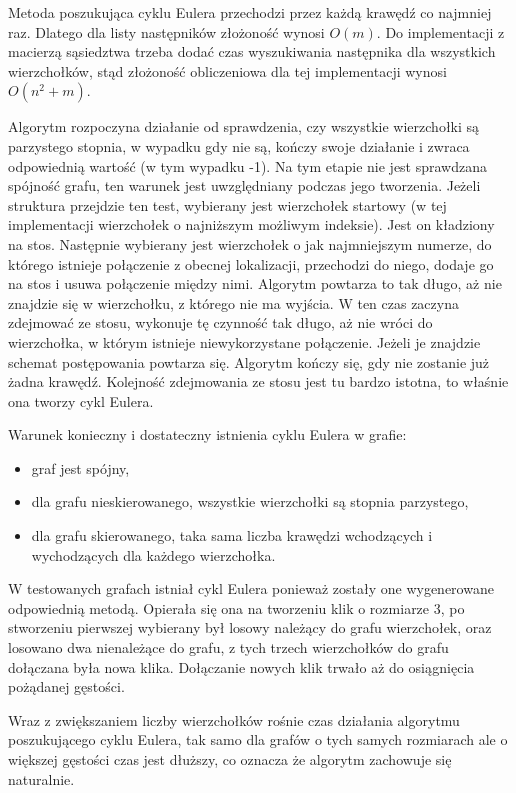 \documentclass[polish,polish,a4paper]{article}
\begin{document}
\begin{spacing}{1.25}
Metoda poszukująca cyklu Eulera przechodzi przez każdą krawędź co najmniej raz. Dlatego dla listy następników złożoność wynosi $ O(m) $. Do implementacji z macierzą sąsiedztwa trzeba dodać czas wyszukiwania następnika dla wszystkich wierzchołków, stąd złożoność obliczeniowa dla tej implementacji wynosi $ O(n^{2} + m) $.

Algorytm rozpoczyna działanie od sprawdzenia, czy wszystkie wierzchołki są parzystego stopnia, w wypadku gdy nie są, kończy swoje działanie i zwraca odpowiednią wartość (w tym wypadku -1). Na tym etapie nie jest sprawdzana spójność grafu, ten warunek jest uwzględniany podczas jego tworzenia. Jeżeli struktura przejdzie ten test, wybierany jest wierzchołek startowy (w tej implementacji wierzchołek o najniższym możliwym indeksie). Jest on kładziony na stos. Następnie wybierany jest wierzchołek o jak najmniejszym numerze, do którego istnieje połączenie z obecnej lokalizacji, przechodzi do niego, dodaje go na stos i usuwa połączenie między nimi. Algorytm powtarza to tak długo, aż nie znajdzie się w wierzchołku, z którego nie ma wyjścia. W ten czas zaczyna zdejmować ze stosu, wykonuje tę czynność tak długo, aż nie wróci do wierzchołka, w którym istnieje niewykorzystane połączenie. Jeżeli je znajdzie schemat postępowania powtarza się. Algorytm kończy się, gdy nie zostanie już żadna krawędź. Kolejność zdejmowania ze stosu jest tu bardzo istotna, to właśnie ona tworzy cykl Eulera.

Warunek konieczny i dostateczny istnienia cyklu Eulera w grafie:
\begin{spacing}{0.5}
	\begin{itemize}
		\item graf jest spójny,
		\item dla grafu nieskierowanego, wszystkie wierzchołki są stopnia parzystego,
		\item dla grafu skierowanego, taka sama liczba krawędzi wchodzących i wychodzących dla każdego wierzchołka.
	\end{itemize}
\end{spacing}

W testowanych grafach istniał cykl Eulera ponieważ zostały one wygenerowane odpowiednią metodą.
Opierała się ona na tworzeniu klik o rozmiarze 3, po stworzeniu pierwszej wybierany był losowy należący do grafu wierzchołek, oraz losowano dwa nienależące do grafu, z tych trzech wierzchołków do grafu dołączana była nowa klika. Dołączanie nowych klik trwało aż do osiągnięcia pożądanej gęstości.

Wraz z zwiększaniem liczby wierzchołków rośnie czas działania algorytmu poszukującego cyklu Eulera, tak samo dla grafów o tych samych rozmiarach ale o większej gęstości czas jest dłuższy, co oznacza że algorytm zachowuje się naturalnie.





\end{spacing}
\end{document}
